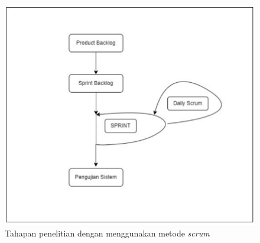 \begin{figure}[H]
	\centering
	\includegraphics[keepaspectratio, width=13cm]{gambar/desain-penelitianpng.png}
	\caption{Tahapan penelitian dengan menggunakan metode \textit{scrum}}
	\label{gambar:desain-penelitianpng.png}
\end{figure}

